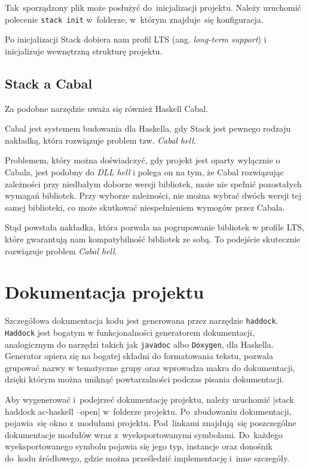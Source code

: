 \documentclass[../../praca.tex]{subfiles}
\begin{document}
Tak~sporządzony plik może posłużyć do~inicjalizacji projektu.
Należy uruchomić polecenie \texttt{stack init} w~folderze,
w~którym znajduje~się konfiguracja.

Po inicjalizacji Stack dobiera nam profil LTS (ang. \emph{long-term support})
i inicjalizuje wewnętrzną strukturę projektu. 

\subsection{Stack a Cabal}

Za podobne narzędzie uważa się również Haskell Cabal.

Cabal jest systemem budowania dla Haskella, gdy Stack jest pewnego rodzaju nakładką,
która rozwiązuje problem tzw. \emph{Cabal hell}.

Problemem, który można doświadczyć, gdy projekt jest oparty wyłącznie o Cabala,
jest podobny do \emph{DLL hell} i polega on na tym, że Cabal rozwiązując zależności
przy niedbałym doborze wersji bibliotek, może nie spełnić pozostałych wymagań
bibliotek. Przy wyborze zależności, nie można wybrać dwóch
wersji tej samej biblioteki, co może skutkować niespełnieniem wymogów przez Cabala.

Stąd powstała nakładka, która pozwala na pogrupowanie bibliotek w profile LTS,
które gwarantują nam kompatybilność bibliotek ze sobą. To podejście skutecznie rozwiązuje
problem \emph{Cabal hell}.

\section{Dokumentacja projektu}

Szczegółowa dokumentacja kodu jest generowana przez narzędzie \texttt{haddock}.
\texttt{Haddock} jest bogatym w funkcjonalności generatorem dokumentacji, 
analogicznym do narzędzi takich jak \texttt{javadoc} albo \texttt{Doxygen}, dla Haskella. 
Generator opiera się na bogatej składni
do formatowania tekstu, pozwala grupować nazwy w tematyczne grupy oraz
wprowadza makra do dokumentacji, dzięki którym można uniknąć powtarzalności podczas
pisania dokumentacji.

Aby wygenerować i~podejrzeć dokumentację projektu, należy uruchomić 
|stack haddock ac-haskell --open| w~folderze projektu. Po~zbudowaniu dokumentacji, pojawia~się
okno z~modułami projektu. Pod~linkami znajdują~się poszczególne dokumentacje
modułów wraz z~wyeksportowanymi symbolami. Do~każdego wyeksportowanego
symbolu pojawia się jego typ, instancje oraz donośnik do~kodu źródłowego,
gdzie można prześledzić implementację i~inne szczegóły.
\end{document}

